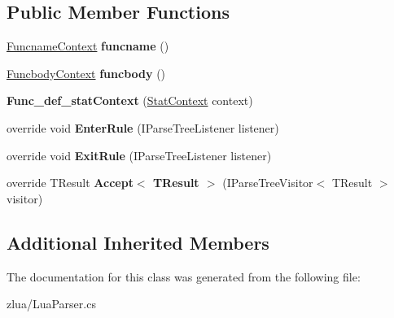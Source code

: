 \subsection*{Public Member Functions}
\begin{DoxyCompactItemize}
\item 
\mbox{\label{classzlua_1_1_lua_parser_1_1_func__def__stat_context_aab1ed338258ef2cf357fcfc640b96e9b}} 
\mbox{\hyperlink{classzlua_1_1_lua_parser_1_1_funcname_context}{Funcname\+Context}} {\bfseries funcname} ()
\item 
\mbox{\label{classzlua_1_1_lua_parser_1_1_func__def__stat_context_abd042137a995ad4494e3a70dbb576824}} 
\mbox{\hyperlink{classzlua_1_1_lua_parser_1_1_funcbody_context}{Funcbody\+Context}} {\bfseries funcbody} ()
\item 
\mbox{\label{classzlua_1_1_lua_parser_1_1_func__def__stat_context_aa87a50bceee612f9c436091d53954ba6}} 
{\bfseries Func\+\_\+def\+\_\+stat\+Context} (\mbox{\hyperlink{classzlua_1_1_lua_parser_1_1_stat_context}{Stat\+Context}} context)
\item 
\mbox{\label{classzlua_1_1_lua_parser_1_1_func__def__stat_context_ab2af58e0afaa632a3be0a0926f1919cc}} 
override void {\bfseries Enter\+Rule} (I\+Parse\+Tree\+Listener listener)
\item 
\mbox{\label{classzlua_1_1_lua_parser_1_1_func__def__stat_context_a7912184a230d54af743198c02f2df412}} 
override void {\bfseries Exit\+Rule} (I\+Parse\+Tree\+Listener listener)
\item 
\mbox{\label{classzlua_1_1_lua_parser_1_1_func__def__stat_context_a3e651a8a4aa240ec8602388e9af61eff}} 
override T\+Result {\bfseries Accept$<$ T\+Result $>$} (I\+Parse\+Tree\+Visitor$<$ T\+Result $>$ visitor)
\end{DoxyCompactItemize}
\subsection*{Additional Inherited Members}


The documentation for this class was generated from the following file\+:\begin{DoxyCompactItemize}
\item 
zlua/Lua\+Parser.\+cs\end{DoxyCompactItemize}
